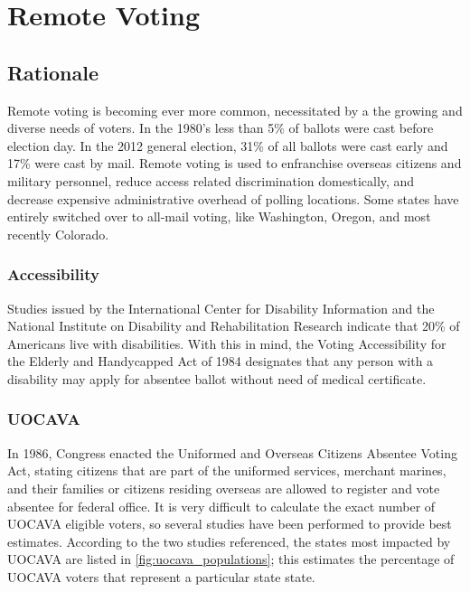 \chapter{Remote Voting}
\label{chapter:remote_voting}

\section{Rationale}
Remote voting is becoming ever more common, necessitated by a the growing and diverse needs of voters. In the 1980's less than 5\% of ballots were cast before election day. In the 2012 general election, 31\% of all ballots were cast early and 17\% were cast by mail. Remote voting is used to enfranchise overseas citizens and military personnel, reduce access related discrimination domestically, and decrease expensive administrative overhead of polling locations. Some states have entirely switched over to all-mail voting, like Washington, Oregon, and most recently Colorado.

\subsection{Accessibility}
Studies issued by the International Center for Disability Information and the National Institute on Disability and Rehabilitation Research indicate that 20\% of Americans live with disabilities. With this in mind, the Voting Accessibility for the Elderly and Handycapped Act of 1984 designates that any person with a disability may apply for absentee ballot without need of medical certificate.


\subsection{UOCAVA}
In 1986, Congress enacted the Uniformed and Overseas Citizens Absentee Voting Act, stating citizens that are part of the uniformed services, merchant marines, and their families or citizens residing overseas are allowed to register and vote absentee for federal office. It is very difficult to calculate the exact number of UOCAVA eligible voters, so several studies have been performed to provide best estimates. According to the two studies referenced, the states most impacted by UOCAVA are listed in \autoref{fig:uocava_populations}; this estimates the percentage of UOCAVA voters that represent a particular state state.

